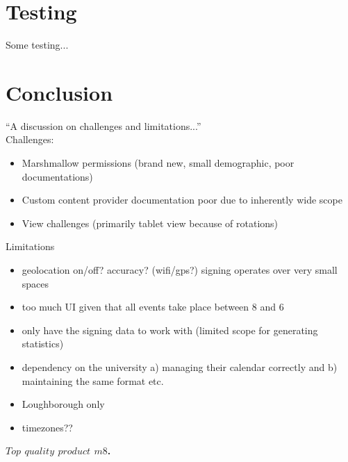 \documentclass{article}
\begin{document}
\section{Testing}
Some testing...

\section{Conclusion}
``A discussion on challenges and limitations...''\\
\newline
Challenges:
\begin{itemize}
    \item Marshmallow permissions (brand new, small demographic, poor documentations)
    \item Custom content provider documentation poor due to inherently wide scope 
    \item View challenges (primarily tablet view because of rotations)
\end{itemize}
Limitations
\begin{itemize}
    \item geolocation on/off? accuracy? (wifi/gps?) signing operates over very small spaces
    \item too much UI given that all events take place between 8 and 6
    \item only have the signing data to work with (limited scope for generating statistics)
    \item dependency on the university a) managing their calendar correctly and b) maintaining the same format etc.
    \item Loughborough only 
    \item timezones??
\end{itemize}
\noindent\textbf{$Top$ $quality$ $product$ $m8$.}
\end{document}
